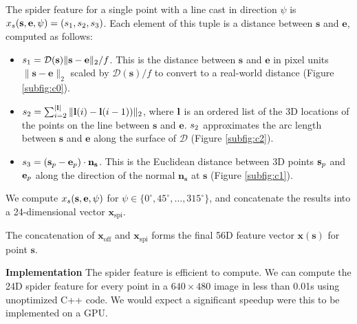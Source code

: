 \documentclass[10pt,twocolumn,letterpaper]{article}
\newcommand{\degree}{^{\circ}}
\newcommand{\feat}{\mathbf{x}}
\newcommand{\rgbdimage}{\mathcal{D}}
\newcommand{\pixelidx}{\mathbf{s}}
\newcommand{\edgeimidx}{\mathbf{e}}
\newcommand{\normal}{\mathbf{n}}
\newcommand{\todo}[1]{\textcolor{red}{TODO: #1}}
\renewcommand{\paragraph}{\vspace{2pt}\noindent\textbf}
\begin{document}
The spider feature for a single point with a line cast in direction $\psi$ is $\scalfeat_s(\pixelidx, \edgeimidx, \psi) = (\spiderfeat_1, \spiderfeat_2, \spiderfeat_3)$.
Each element of this tuple is a distance between $\pixelidx$ and $\edgeimidx$, computed as follows:
\begin{itemize}

\item $\spiderfeat_1 = \rgbdimage(\pixelidx) \|\pixelidx - \edgeimidx\|_2 / f$. This is the distance between $\pixelidx$ and $\edgeimidx$ in pixel units $\|\pixelidx - \edgeimidx\|_2$ scaled by $\rgbdimage(\pixelidx) / f$ to convert to a real-world distance (Figure \ref{subfig:c0}).

\item $s_2 = \sum_{i=2}^{|\mathbf{l}|} \| \mathbf{l}(i) - \mathbf{l}(i-1)) \|_2 $, where $\mathbf{l}$ is an ordered list of the 3D locations of the points on the line between $\pixelidx$ and $\edgeimidx$.
$s_2$ approximates the arc length between $\pixelidx$ and $\edgeimidx$ along the surface of $\rgbdimage$  (Figure \ref{subfig:c2}).

\item $\spiderfeat_3 = (\pointthreed - \edgethreed) \cdot \normal_\pixelidx$. 
This is the Euclidean distance between 3D points $\pointthreed$ and $\edgethreed$ along the direction of the normal $\normal_\pixelidx$ at $\pixelidx$  (Figure \ref{subfig:c1}).

\end{itemize}

We compute $\scalfeat_s(\pixelidx, \edgeimidx, \psi)$ for  $\psi \in \{0\degree, 45\degree, \ldots, 315\degree\}$, and concatenate the results into a  24-dimensional vector $\feat_{\text{spi}}$.

The concatenation of $\feat_\text{off}$ and $\feat_\text{spi}$ forms the final 56D feature vector $\feat(\pixelidx)$ for point $\pixelidx$.

\paragraph{Implementation}
The spider feature is efficient to compute.
We can compute the 24D spider feature for every point in a $640\times480$ image in less than 0.01s using unoptimized C++ code.
We would expect a significant speedup were this to be implemented on a GPU.

\end{document}
